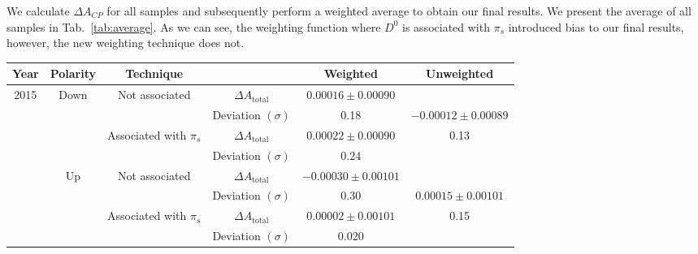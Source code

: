 \documentclass{article}
\begin{document}
        We calculate $\Delta A_{CP}$ for all samples and subsequently perform a weighted average to obtain our final results.
        We present the average of all samples in Tab.~\ref{tab:average}.
        As we can see, the weighting function where $D^0$ is associated with $\pi_s$ introduced bias to our final results, however, the new weighting technique does not.

        \begin{center}
                \begin{tabular}{c|c|c|c|c|c}
                        Year & Polarity & Technique & & Weighted & Unweighted\\
                        \hline\hline
                        \multirow{8}{*}{2015} & \multirow{4}{*}{Down} & \multirow{2}{*}{Not associated} & $\Delta A_\text{total}$ & $0.00016\pm 0.00090$& \\
                        & & & Deviation $(\sigma)$ & 0.18& $-0.00012\pm 0.00089$\\
                        \cline{3-5}
                        & & \multirow{2}{*}{Associated with $\pi_s$} & $\Delta A_\text{total}$ & $0.00022\pm 0.00090$& 0.13\\
                        & & & Deviation $(\sigma)$ & 0.24& \\
                        \cline{2-6}
                        & \multirow{4}{*}{Up} & \multirow{2}{*}{Not associated} & $\Delta A_\text{total}$ & $-0.00030\pm 0.00101$& \\
                        & & & Deviation $(\sigma)$ & 0.30& $0.00015\pm 0.00101$\\
                        \cline{3-5}
                        & & \multirow{2}{*}{Associated with $\pi_s$} & $\Delta A_\text{total}$ & $0.00002\pm 0.00101$& 0.15\\
                        & & & Deviation $(\sigma)$ & 0.020& \\
                        \hline


\end{tabular}
\end{center}
\end{document}
